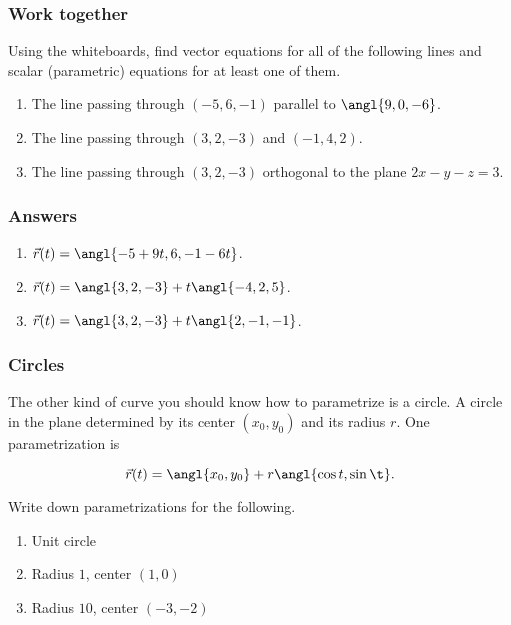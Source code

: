 \documentclass[11pt,ignorenonframetext,]{beamer}
\begin{document}
\begin{frame}\frametitle{Work together}

Using the whiteboards, find vector equations for all of the following
lines and scalar (parametric) equations for at least one of them.

\begin{enumerate}
\def\labelenumi{\arabic{enumi}.}
\itemsep1pt\parskip0pt
\item
  The line passing through $(-5, 6, -1)$ parallel to $\angl{9, 0, -6}$.
\item
  The line passing through $(3, 2, -3)$ and $(-1, 4, 2)$.
\item
  The line passing through $(3, 2, -3)$ orthogonal to the plane
  $2x-y-z=3$.
\end{enumerate}

\end{frame}

\begin{frame}\frametitle{Answers}

\begin{enumerate}
\def\labelenumi{\arabic{enumi}.}
\itemsep1pt\parskip0pt
\item
  $\vec{r}(t) = \angl{-5 + 9t, 6, -1 - 6t}$.
\item
  $\vec{r}(t) = \angl{3, 2, -3} + t\angl{-4, 2, 5}$.
\item
  $\vec{r}(t) = \angl{3, 2, -3} + t\angl{2, -1, -1}$.
\end{enumerate}

\end{frame}

\begin{frame}\frametitle{Circles}

The other kind of curve you should know how to parametrize is a circle.
A circle in the plane determined by its center $(x_0, y_0)$ and its
radius $r$. One parametrization is

\[\vec{r}(t) = \angl{x_0, y_0} + r \angl{\cos t, \sin \t}.\]

Write down parametrizations for the following.

\begin{enumerate}
\def\labelenumi{\arabic{enumi}.}
\itemsep1pt\parskip0pt
\item
  Unit circle
\item
  Radius $1$, center $(1,0)$
\item
  Radius $10$, center $(-3, -2)$
\end{enumerate}

\end{frame}
\end{document}
